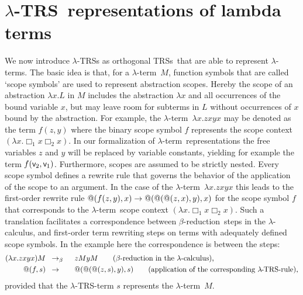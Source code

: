 \documentclass[
submission
]{dmtcs-episciences-tampered}
\makeatletter
\newcommand{\fap}[2]{#1({#2})}
\newcommand{\bfap}[3]{{#1}({#2},\hspace*{0.05pt}{#3})}
\newcommand{\iap}[2]{#1 _{#2}}
\newcommand{\indap}[2]{#1 _{#2}}
\newcommand{\nb}{\nobreakdash}
\newcommand{\avar}{x}
\newcommand{\bvar}{y}
\newcommand{\cvar}{z}
\newcommand{\ater}{s}
\newcommand{\TRS}{TRS}
\newcommand{\TRSs}{TRSs}
\newcommand{\sfolapp}{@}
\newcommand{\folapp}{\bfap{\sfolapp}}
\newcommand{\afovar}{\mathsf{v}}
\newcommand{\afovari}[1]{\indap{\afovar}{\hspace*{-0.25pt}#1}}
\newcommand{\afoscopesym}{f}
\newcommand{\afoscope}{\fap{\afoscopesym}}
\newcommand{\hole}{\Box}
\newcommand{\holei}{\iap{\hole}}
\newcommand{\alter}{M}
\newcommand{\clter}{L}
\newcommand{\sslabs}{\lambda}
\newcommand{\slabs}[1]{\sslabs{#1}.}
\newcommand{\labs}[2]{\slabs{#1}{#2}}
\newcommand{\lapp}[2]{{#1}{#2}}
\newcommand{\sred}{\to}
\newcommand{\red}{\mathrel{\sred}}
\newcommand{\sbetared}{\sred_{\beta}}
\newcommand{\betared}{\mathrel{\sbetared}}
\newcommand{\lambdacalculus}{$\lambda$\nb-cal\-cu\-lus}
\newcommand{\lambdaterm}{$\lambda$\nb-term}
\newcommand{\lambdaterms}{\lambdaterm{s}}
\newcommand{\betareduction}{$\beta$\nb-re\-duc\-tion}
\newcommand{\lTRS}{$\lambda$\hspace*{-0.5pt}\nb-\hspace*{-0.5pt}\TRS}
\theoremstyle{plain}
\theoremstyle{definition}
\makeatother
\begin{document}
\section{\protect\lTRS\ representations of lambda terms}
  \label{sec:lTRSs}


We now introduce \lTRS{s} as orthogonal \TRSs\ that are able to represent \lambdaterms.
The basic idea is that, for a \lambdaterm~$\alter$, function symbols that are called `scope symbols'
are used to represent abstraction scopes.
Hereby the scope of an abstraction $\labs{\avar}{\clter}$ in $\alter$ 
includes the abstraction $\sslabs{\avar}$ and all occurrences of the bound variable $\avar$, but may leave room
for subterms in $\clter$ without occurrences of $\avar$ bound by the abstraction.
For example, the \lambdaterm~$\labs{\avar}{\lapp{\lapp{\lapp{\cvar}{\avar}}{\bvar}}{\avar}}$
may be denoted as the term $\afoscope{\cvar,\bvar}$
where the binary scope symbol $\afoscopesym$ represents the scope context $(\labs{\avar}{\lapp{\lapp{\lapp{\holei{1}}{\avar}}{\holei{2}}}{\avar}})$.
In our formalization of \lambdaterm\ representations the free variables $\cvar$ and $\bvar$
will be replaced by variable constants, yielding for example the term  $\afoscope{\afovari{2},\afovari{1}}$.
Furthermore, scopes are assumed to be strictly nested.
Every scope symbol defines a rewrite rule that governs the behavior of the application of the scope to an argument.
In the case of the \lambdaterm~$\labs{\avar}{\lapp{\lapp{\lapp{\cvar}{\avar}}{\bvar}}{\avar}}$
this leads to the first-order rewrite rule 
$\folapp{\afoscope{\cvar,\bvar}}{\avar} \red \folapp{\folapp{\folapp{\cvar}{\avar}}{\bvar}}{\avar}$
for the scope symbol $\afoscopesym$ that corresponds to the \lambdaterm\ scope context $(\labs{\avar}{\lapp{\lapp{\lapp{\holei{1}}{\avar}}{\holei{2}}}{\avar}})$.
Such a translation facilitates a correspondence between \betareduction\ steps in the \lambdacalculus,
and first-order term rewriting steps on terms with adequately defined scope symbols. In the example here the correspondence is between the steps: 
\begin{alignat}{3}
  \lapp{(\labs{\avar}{\lapp{\lapp{\lapp{\cvar}{\avar}}{\bvar}}{\avar}})}
       {\alter} 
    & \;\; \betared \;\;  & & 
  \lapp{\lapp{\lapp{\cvar}{\alter}}{\bvar}}{\alter}     
    \tag*{(\betareduction\ in the \lambdacalculus),}
  \\
  \folapp{\afoscopesym}{\ater}
    & \;\; \red \;\; & &
  \folapp{\folapp{\folapp{\cvar}{\ater}}{\bvar}}{\ater}
    \tag*{(application of the corresponding \lTRS-rule),}
\end{alignat}
provided that the \lTRS\nb-term $\ater$ represents the \lambdaterm~$\alter$.
\end{document}
